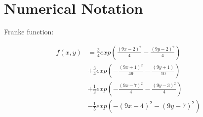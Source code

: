 \documentclass[english,notitlepage,reprint,nofootinbib]{revtex4-1}  %
\begin{document}
\section{Numerical Notation}\label{sec:NOTATION}
\caption{Franke function:}
\label{eq:FrankeFunction}
\begin{align*}
    f(x,y) &= \frac{3}{4} exp \left( \frac{(9x -2)^2}{4} - \frac{(9y -2)^2}{4}  \right) \\
    &+  \frac{3}{4} exp \left( -\frac{(9x + 1)^2}{49} - \frac{(9y + 1)}{10} \right) \\
    &+ \frac{1}{2} exp \left( -\frac{(9x -7)^2}{4} - \frac{(9y - 3)^2}{4} \right) \\
    &- \frac{1}{5} exp \left( - (9x - 4)^2 - (9y - 7)^2 \right)
\end{align*}
\end{document}

